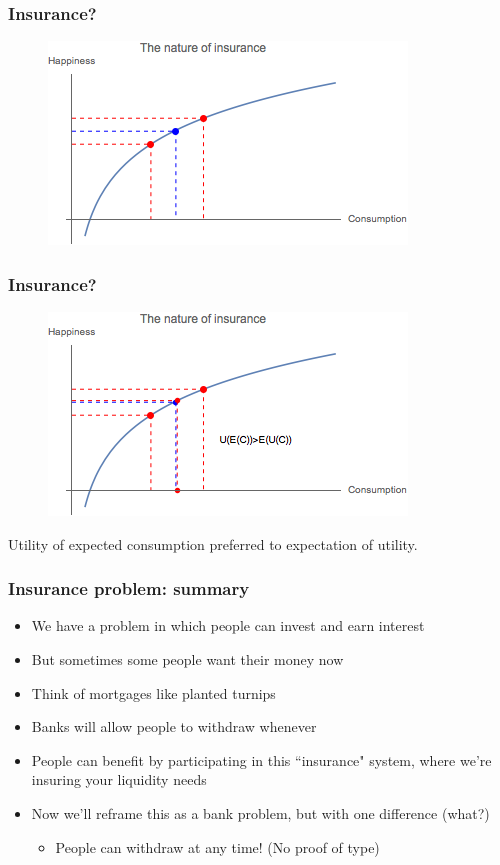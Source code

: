 \documentclass{beamer}
\begin{document}
\begin{frame}
\frametitle{Insurance?}
\begin{figure}
\centering
\includegraphics[scale=0.8]{Figures/Insurance_4.png}
\end{figure}
\end{frame}

\begin{frame}
\frametitle{Insurance?}
\begin{figure}
\centering
\includegraphics[scale=0.8]{Figures/Insurance_5.png}
\end{figure}
Utility of expected consumption preferred to expectation of utility.
\end{frame}


\begin{frame}
\frametitle{Insurance problem: summary}
\begin{itemize}
\item We have a problem in which people can invest and earn interest
\bigskip
\item But sometimes some people want their money now
\bigskip
\item Think of mortgages like planted turnips
\bigskip
\item Banks will allow people to withdraw whenever
\bigskip
\item People can benefit by participating in this ``insurance" system, where we're insuring your liquidity needs
\bigskip
\item Now we'll reframe this as a bank problem, but with one difference (what?)
\bigskip
\begin{itemize}
\item People can withdraw at any time! (No proof of type)
\end{itemize}
\end{itemize}
\end{frame}
\end{document}
